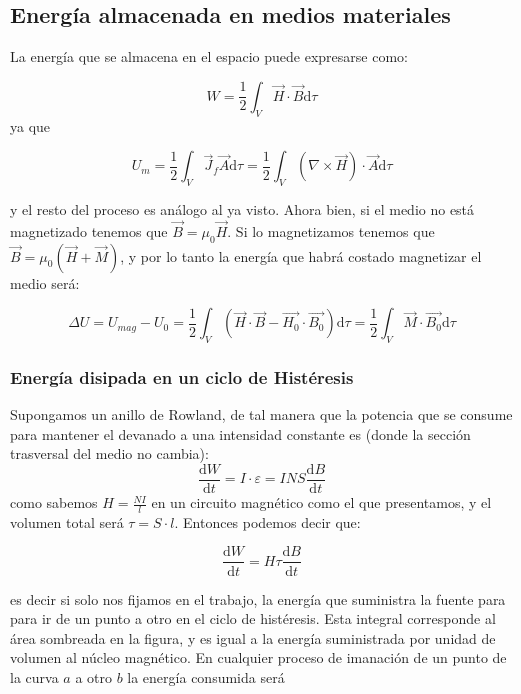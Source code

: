 \documentclass[12pt,a4paper]{article}
\newcommand{\D}{\mathrm{d}}
\begin{document}
\subsection{Energía almacenada en medios materiales}

La energía que se almacena en el espacio puede expresarse como:

\begin{equation}
W = \dfrac{1}{2} \int_V \vec{H} \cdot \vec{B} \D \tau
\end{equation}
ya que 

$$ U_m = \dfrac{1}{2} \int_V \vec{J}_f \vec{A} \D \tau = \dfrac{1}{2} \int_V (\nabla \times \vec{H}) \cdot \vec{A} \D \tau $$

y el resto del proceso es análogo al ya visto. Ahora bien, si el medio no está magnetizado tenemos que $\vec{B} = \mu_0 \vec{H}$. Si lo magnetizamos tenemos que $\vec{B} = \mu_0 (\vec{H}+\vec{M})$, y por lo tanto la energía que habrá costado magnetizar el medio será:

\begin{equation}
\Delta U = U_{mag} - U_0 = \dfrac{1}{2} \int_V (\vec{H} \cdot \vec{B} - \vec{H_0} \cdot \vec{B_0}) \D \tau = \dfrac{1}{2} \int_V \vec{M} \cdot \vec{B_0} \D \tau
\end{equation}


\subsubsection{Energía disipada en un ciclo de Histéresis}



Supongamos un anillo de Rowland, de tal manera que la potencia que se consume para mantener el devanado a una intensidad constante es (donde la sección trasversal del medio no cambia):
$$ \dfrac{\D W}{\D t} = I \cdot \varepsilon = I N S \dfrac{\D B}{\D t} $$
como sabemos $H = \frac{NI}{l}$ en un circuito magnético como el que presentamos, y el volumen total será $\tau = S \cdot l$. Entonces podemos decir que:

\begin{equation}
\dfrac{\D W}{\D t} = H \tau \dfrac{\D B}{\D t}
\end{equation}

es decir si solo nos fijamos en el trabajo, la energía que suministra la fuente para para ir de un punto a otro en el ciclo de histéresis. Esta integral corresponde al área sombreada en la figura, y es igual a la energía suministrada por unidad de volumen al núcleo magnético. En cualquier proceso de imanación de un punto de la curva $a$ a otro $b$ la energía consumida será
\end{document}
